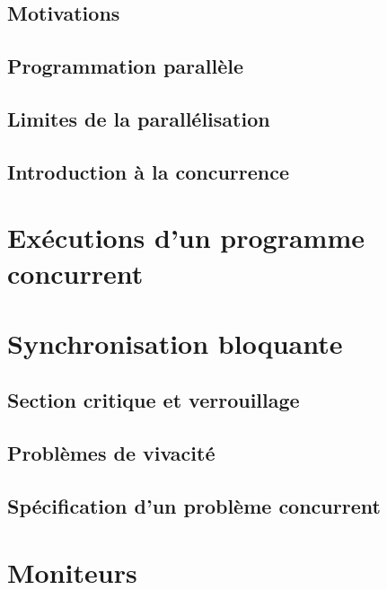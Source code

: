 \subsection{Motivations}


\subsection{Programmation parallèle}


\subsection{Limites de la parallélisation}


\subsection{Introduction à la concurrence}

 

\section{Exécutions d'un programme concurrent}



\section{Synchronisation bloquante}

\subsection{Section critique et verrouillage}


\subsection{Problèmes de vivacité}


\subsection{Spécification d'un problème concurrent}

 

\section{Moniteurs}


